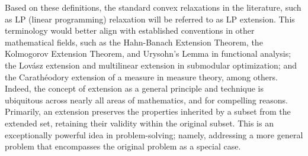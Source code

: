 \documentclass[11pt]{article}\usepackage[]{graphicx}\usepackage[]{xcolor}
\begin{document}
Based on these definitions, the standard convex relaxations in the literature, such as LP (linear programming) relaxation will be referred to as LP extension. This terminology would better align with established conventions in other mathematical fields, such as the Hahn-Banach Extension Theorem, the Kolmogorov Extension Theorem, and Urysohn’s Lemma in functional analysis; the Lov\'{a}sz extension and multilinear extension in submodular optimization; and the Carath\'{e}odory extension of a measure in measure theory, among others. Indeed, the concept of extension as a general principle and technique is ubiquitous across nearly all areas of mathematics, and for compelling reasons. Primarily, an extension preserves the properties inherited by a subset from the extended set, retaining their validity within the original subset. This is an exceptionally powerful idea in problem-solving; namely, addressing a more general problem that encompasses the original problem as a special case. 
\end{document}
